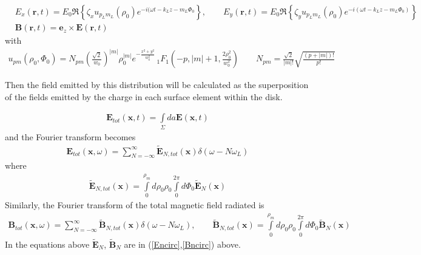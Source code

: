 \begin{align}
     & E_x({\bm r},t) = E_0\Re\left\{\zeta_x u_{p_Lm_L}(\rho_0)e^{-i(\omega t-k_Lz-m_L\varPhi_0}\right\},\qquad
    E_y({\bm r},t) = E_0\Re\left\{\zeta_y u_{p_Lm_L}(\rho_0)e^{-i(\omega t-k_Lz-m_L\varPhi_0)}\right\}          \\
     & {\bm B}({\bm r},t) = {\bm e}_z\times{\bm E}({\bm r},t)
\end{align}
with
\begin{align}
    u_{pm}(\rho_0,\varPhi_0) = N_{pm}\left(\frac{\sqrt{2}}{w_0}\right)^{|m|}\rho_0^{|m|}e^{-\frac{x^2+y^2}{w_0^2}}\, _1F_1(-p, |m|+1, \frac{2\rho_0^2}{w_0^2})
    \qquad      N_{pm} = \frac{\sqrt{2}}{|m|!}\sqrt{\frac{(p+|m|)!}{p!}}
\end{align}


Then the field emitted by this distribution will be calculated as the superposition of the fields emitted by the charge in each surface element within the disk.

\begin{align}
    {\bm E}_{tot}({\bm x},t) = \int \limits_{\Sigma} da {\bm E}({\bm x},t)
\end{align}
and the Fourier transform becomes
\begin{align}
    {\bm E}_{tot}({\bm x},\omega) = \sum\limits_{N=-\infty}^{\infty} \tilde{\bm E}_{N,tot}({\bm x})\delta(\omega-N\omega_L)
\end{align}
where
\begin{align}
    \tilde {\bm E}_{N,tot}({\bm x})=\int\limits_0^{\rho_m}d\rho_0\rho_0\int\limits_0^{2\pi}d\varPhi_0 \tilde{\bm E}_N({\bm x})\label{int-En}
\end{align}
Similarly, the Fourier transform of the total magnetic field radiated is
\begin{align}
    {\bm B}_{tot}({\bm x},\omega) = \sum\limits_{N=-\infty}^{\infty} \tilde{\bm B}_{N,tot}({\bm x})\delta(\omega-N\omega_L) ,\qquad    \tilde {\bm B}_{N,tot}({\bm x})=\int\limits_0^{\rho_m}d\rho_0\rho_0\int\limits_0^{2\pi}d\varPhi_0 \tilde{\bm B}_N({\bm x})
\end{align}
In the equations above $\tilde{\bm E}_N$, $\tilde {\bm B}_N$ are in (\ref{Encirc},\ref{Bncirc}) above.

